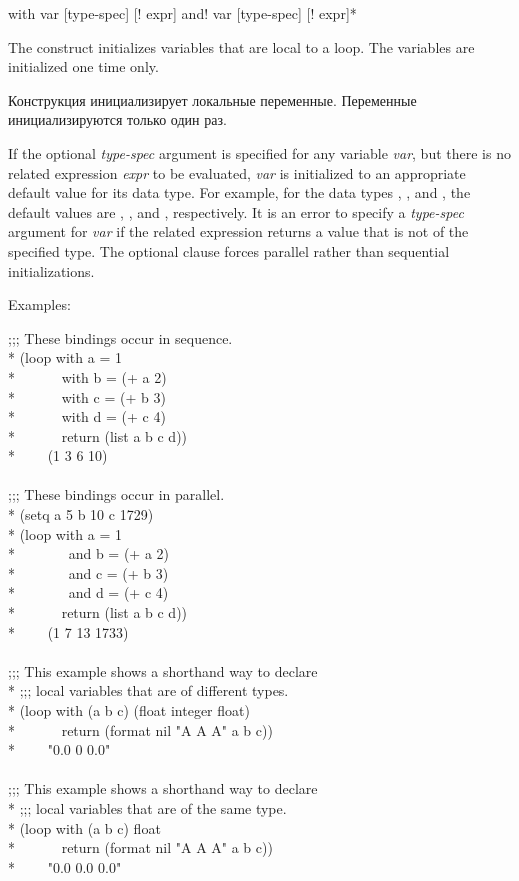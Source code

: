 \begin{defloop}
with var [type-spec] [\!\Xequal! expr] {\!and! var [type-spec] [\!\Xequal! expr]}*

The  construct initializes variables that are local to 
a loop.  The variables are initialized one time only.

Конструкция  инициализирует локальные переменные. Переменные
инициализируются только один раз.

If the optional \emph{type-spec\/} argument is specified for any variable 
\emph{var\/}, but there is no related expression \emph{expr} to be evaluated, \emph{var\/}
is initialized to an appropriate default value for its data type.
For example, for the data types , , and ,
the default values are , , and , respectively.
It is an error to specify a \emph{type-spec\/} argument for \emph{var\/} if
the related expression returns a value that is not of the specified type.
The optional  clause forces parallel rather than sequential 
initializations.

Examples:
\begin{lisp}
;;; These bindings occur in sequence. \\*
(loop with a = 1  \\*
~~~~~~with b = (+ a 2)  \\*
~~~~~~with c = (+ b 3) \\*
~~~~~~with d = (+ c 4) \\*
~~~~~~return (list a b c d)) \\*
~~~\EV~(1 3 6 10) \\
 \\
;;; These bindings occur in parallel. \\*
(setq a 5 b 10 c 1729) \\*
(loop with a = 1 \\*
~~~~~~~and b = (+ a 2) \\*
~~~~~~~and c = (+ b 3) \\*
~~~~~~~and d = (+ c 4) \\*
~~~~~~return (list a b c d)) \\*
~~~\EV~(1 7 13 1733) \\
 \\
;;; This example shows a shorthand way to declare \\*
;;; local variables that are of different types. \\*
(loop with (a b c) (float integer float) \\*
~~~~~~return (format nil "{\Xtilde}A {\Xtilde}A {\Xtilde}A" a b c)) \\*
~~~\EV~"0.0 0 0.0" \\
 \\
;;; This example shows a shorthand way to declare \\*
;;; local variables that are of the same type. \\*
(loop with (a b c) float  \\*
~~~~~~return (format nil "{\Xtilde}A {\Xtilde}A {\Xtilde}A" a b c)) \\*
~~~\EV~"0.0 0.0 0.0"
\end{lisp}
\end{defloop}


